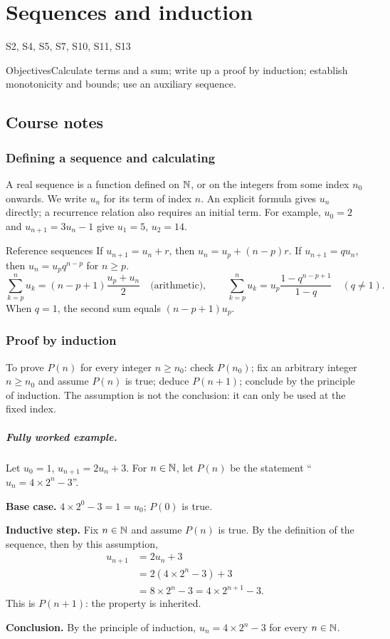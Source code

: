 \setcounter{chapter}{0}\chapter{Sequences and induction}\label{ch:1}

{\small\sffamily\color{teal}S2, S4, S5, S7, S10, S11, S13\par}

\begin{retenir}{Objectives}Calculate terms and a sum; write up a proof by induction; establish monotonicity and bounds; use an auxiliary sequence.\end{retenir}

\section{Course notes}
\subsection{Defining a sequence and calculating}
A real sequence is a function defined on $\mathbb N$, or on the integers from some index $n_0$ onwards. We write $u_n$ for its term of index $n$. An explicit formula gives $u_n$ directly; a recurrence relation also requires an initial term. For example, $u_0=2$ and $u_{n+1}=3u_n-1$ give $u_1=5$, $u_2=14$.
\begin{retenir}{Reference sequences}
If $u_{n+1}=u_n+r$, then $u_n=u_p+(n-p)r$. If $u_{n+1}=qu_n$, then $u_n=u_pq^{n-p}$ for $n\ge p$.
\[\sum_{k=p}^n u_k=(n-p+1)\frac{u_p+u_n}{2}\quad\text{(arithmetic)},\qquad
\sum_{k=p}^n u_k=u_p\frac{1-q^{n-p+1}}{1-q}\quad(q\ne1).\]
When $q=1$, the second sum equals $(n-p+1)u_p$.
\end{retenir}
\subsection{Proof by induction}
To prove $P(n)$ for every integer $n\ge n_0$: check $P(n_0)$; fix an arbitrary integer $n\ge n_0$ and assume $P(n)$ is true; deduce $P(n+1)$; conclude by the principle of induction. The assumption is not the conclusion: it can only be used at the fixed index.
\paragraph{Fully worked example.} Let $u_0=1$, $u_{n+1}=2u_n+3$. For $n\in\mathbb N$, let $P(n)$ be the statement ``$u_n=4\times2^n-3$''.
\par\smallskip\textbf{Base case.} $4\times2^0-3=1=u_0$; $P(0)$ is true.
\par\smallskip\textbf{Inductive step.} Fix $n\in\mathbb N$ and assume $P(n)$ is true. By the definition of the sequence, then by this assumption,
\[\begin{aligned}u_{n+1}&=2u_n+3\\&=2(4\times2^n-3)+3\\&=8\times2^n-3=4\times2^{n+1}-3.\end{aligned}\]
This is $P(n+1)$: the property is inherited.
\par\smallskip\textbf{Conclusion.} By the principle of induction, $u_n=4\times2^n-3$ for every $n\in\mathbb N$.
